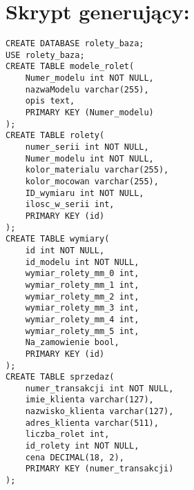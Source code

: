 \documentclass[a4paper,12pt]{article}
\begin{document}
\section{Skrypt generujący:}

\begin{lstlisting}
CREATE DATABASE rolety_baza;
USE rolety_baza;
CREATE TABLE modele_rolet(
    Numer_modelu int NOT NULL,
    nazwaModelu varchar(255),
    opis text,
    PRIMARY KEY (Numer_modelu)
);
CREATE TABLE rolety(
    numer_serii int NOT NULL,
    Numer_modelu int NOT NULL,
    kolor_materialu varchar(255),
    kolor_mocowan varchar(255),
    ID_wymiaru int NOT NULL,
	ilosc_w_serii int,
    PRIMARY KEY (id)
);
CREATE TABLE wymiary(
    id int NOT NULL,
    id_modelu int NOT NULL,
    wymiar_rolety_mm_0 int,
    wymiar_rolety_mm_1 int,
    wymiar_rolety_mm_2 int,
    wymiar_rolety_mm_3 int,
    wymiar_rolety_mm_4 int,
    wymiar_rolety_mm_5 int,
    Na_zamowienie bool,
    PRIMARY KEY (id)
);
CREATE TABLE sprzedaz(
    numer_transakcji int NOT NULL,
    imie_klienta varchar(127),
    nazwisko_klienta varchar(127),
    adres_klienta varchar(511),
    liczba_rolet int,
    id_rolety int NOT NULL,
    cena DECIMAL(18, 2),
    PRIMARY KEY (numer_transakcji)
);
\end{lstlisting}
\end{document}
